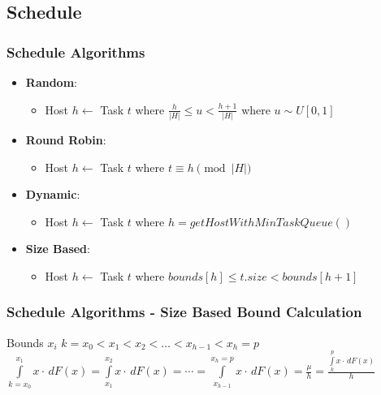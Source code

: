 \documentclass[red]{beamer}
\begin{document}
\subsection{Schedule}
\begin{frame}
	\frametitle{Schedule Algorithms}
	
	\begin{itemize}
		\item<1-> \textbf{Random}:
			\begin{itemize}
			\item Host $h \leftarrow $ Task $ t $ where $ \frac{h}{|H|} \le u < \frac{h+1}{|H|}$ where $ u \sim U[0, 1] $ 
			\end{itemize}
		\item<2-> \textbf{Round Robin}:
			\begin{itemize}
			\item Host $h \leftarrow $ Task $ t $ where $ t \equiv h \pmod{|H|} $
			\end{itemize}
		\item<3-> \textbf{Dynamic}:
			\begin{itemize}
			\item Host $h \leftarrow $ Task $ t $ where $ h = getHostWithMinTaskQueue()$
			\end{itemize}
		\item<4-> \textbf{Size Based}:
			\begin{itemize}
			\item Host $h \leftarrow $ Task $ t $ where $ bounds[h] \le t.size < bounds[h+1] $
			\end{itemize}
		
	\end{itemize}

\end{frame}

\begin{frame}
	\frametitle{Schedule Algorithms - Size Based Bound Calculation}
	
	Bounds $ x_i $ \vspace{0.4cm} \linebreak 
	$ k = x_0 < x_1 < x_2 < \dots < x_{h-1} < x_h = p $ \linebreak
	$ \int\limits_{k=x_0}^{x_1} x \cdot \, dF(x) =  \int\limits_{x_1}^{x_2} x \cdot \, dF(x) = \cdots =  \int\limits_{x_{h-1}}^{x_h=p} x \cdot \, dF(x) = \frac{\mu}{h} = \frac{\int\limits_{k}^{p} x \cdot \, dF(x)}{h} $			
\end{frame}
\end{document}
